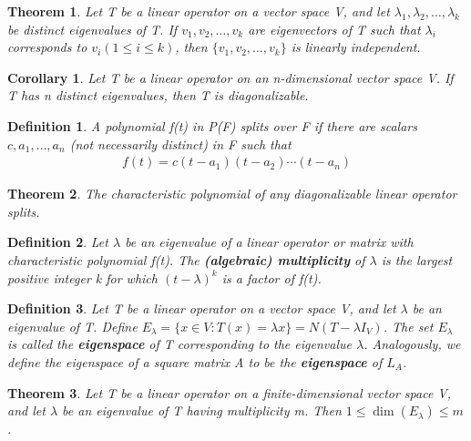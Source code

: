 \documentclass{article}
\newcommand{\bd}[1]{\textbf{#1}}
\theoremstyle{plain}
\newtheorem{theorem}{Theorem}[section]
\newtheorem*{corollary}{Corollary}
\newtheorem*{definition1}{Definition}
\theoremstyle{plain} %
\begin{document}
\begin{theorem}
  Let T be a linear operator on a vector space V, and  let $\lambda_1, \lambda_2, \ldots, \lambda_k$ be distinct eigenvalues of T. If $v_1, v_2,\ldots,v_k$ are eigenvectors of T such that $\lambda_i$ corresponds to $v_i (1 \leq i \leq k)$, then $\{v_1, v_2,\ldots,v_k\}$ is linearly independent.
\end{theorem}

\begin{corollary}
  Let T be a linear operator on an n-dimensional vector space V. If T has n distinct eigenvalues, then T is diagonalizable.
\end{corollary}

\begin{definition1}
  A polynomial f(t) in P(F) splits over F if there are scalars $c, a_1,\ldots,a_n$ (not necessarily distinct) in F such that
  \begin{align*}
    f(t)=c(t-a_1)(t-a_2)\cdots(t-a_n)
  \end{align*}
\end{definition1}

\begin{theorem}
  The characteristic polynomial of any diagonalizable linear operator splits.
\end{theorem}

\begin{definition1}
  Let $\lambda$ be an eigenvalue of a linear operator or matrix with characteristic polynomial f(t). The \bd{(algebraic) multiplicity} of $\lambda$ is the largest positive integer k for which $(t − \lambda)^k$ is a factor of f(t).
\end{definition1}

\begin{definition1}
  Let T be a linear operator on a vector space V, and let $\lambda$ be an eigenvalue of T. Define $E_\lambda = \{x \in V: T(x) = \lambda x\} = N(T − \lambda I_V)$. The set $E_\lambda$ is called the \bd{eigenspace} of T corresponding to the eigenvalue $\lambda$. Analogously, we define the eigenspace of a square matrix A to be the \bd{eigenspace} of $L_A$.
\end{definition1}

\begin{theorem}
  Let T be a linear operator on a finite-dimensional vector space V, and let $\lambda$ be an eigenvalue of T having multiplicity m. Then $1 \leq \dim(E_\lambda) \leq m$.
\end{theorem}
\end{document}
